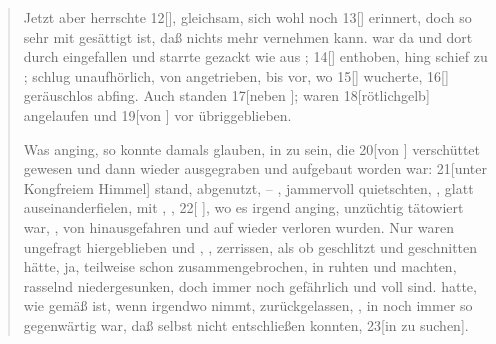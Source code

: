 \begin{nohyphens}
\begin{quote}
\begin{linenumbers}
      Jetzt aber herrschte 12[],  gleichsam,  sich wohl noch 13[] erinnert, doch so sehr mit  gesättigt ist, daß  nichts mehr vernehmen kann.
       war da und dort durch  eingefallen und starrte gezackt wie  aus ; 14[] enthoben, hing  schief zu ;  schlug unaufhörlich, von  angetrieben, bis   vor, wo 15[] wucherte, 16[]  geräuschlos abfing.
      Auch  standen 17[neben ];  waren 18[rötlichgelb] angelaufen und 19[von ] vor  übriggeblieben.

      Was  anging, so konnte  damals glauben, in  zu sein, die 20[von ] verschüttet gewesen und dann wieder ausgegraben und aufgebaut worden war: 21[unter Kong{freiem Himmel}] stand, abgenutzt,   – ,  jammervoll quietschten, ,  glatt auseinanderfielen,  mit , , 22[ ], wo es irgend anging, unzüchtig tätowiert war, ,  von  hinausgefahren und auf  wieder verloren wurden.
      Nur  waren ungefragt hiergeblieben und , , zerrissen, als ob   geschlitzt und geschnitten hätte, ja, teilweise schon zusammengebrochen, in  ruhten und   machten,  rasselnd niedergesunken, doch immer noch gefährlich und voll  sind.
       hatte, wie  gemäß ist, wenn  irgendwo  nimmt,  zurückgelassen, , in   noch immer so gegenwärtig war, daß selbst   nicht entschließen konnten, 23[in   zu suchen].
    \end{linenumbers}
  \end{quote}
\end{nohyphens}

